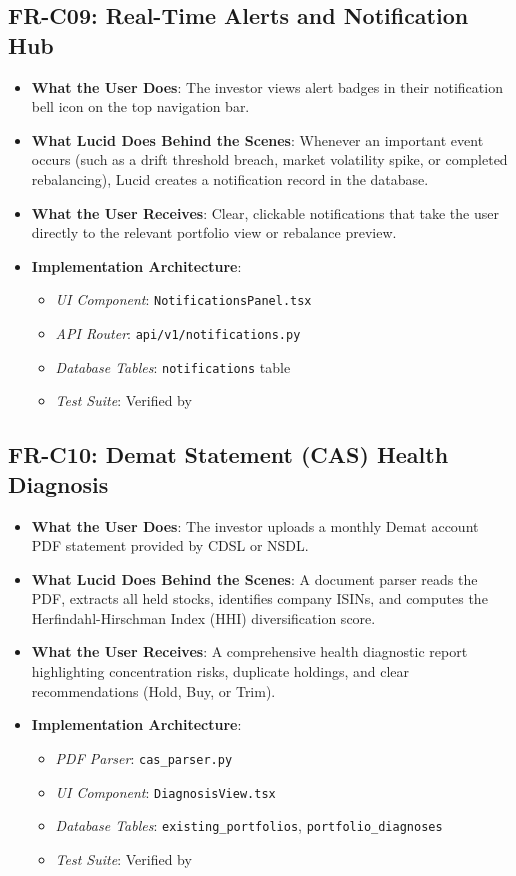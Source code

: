 \subsection{FR-C09: Real-Time Alerts and Notification Hub}
\begin{itemize}
    \item \textbf{What the User Does}: The investor views alert badges in their notification bell icon on the top navigation bar.
    \item \textbf{What Lucid Does Behind the Scenes}: Whenever an important event occurs (such as a drift threshold breach, market volatility spike, or completed rebalancing), Lucid creates a notification record in the database.
    \item \textbf{What the User Receives}: Clear, clickable notifications that take the user directly to the relevant portfolio view or rebalance preview.
    \item \textbf{Implementation Architecture}:
    \begin{itemize}
        \item \textit{UI Component}: \texttt{NotificationsPanel.tsx}
        \item \textit{API Router}: \texttt{api/v1/notifications.py}
        \item \textit{Database Tables}: \texttt{notifications} table
        \item \textit{Test Suite}: Verified by 
    \end{itemize}
\end{itemize}

\subsection{FR-C10: Demat Statement (CAS) Health Diagnosis}
\begin{itemize}
    \item \textbf{What the User Does}: The investor uploads a monthly Demat account PDF statement provided by CDSL or NSDL.
    \item \textbf{What Lucid Does Behind the Scenes}: A document parser reads the PDF, extracts all held stocks, identifies company ISINs, and computes the Herfindahl-Hirschman Index (HHI) diversification score.
    \item \textbf{What the User Receives}: A comprehensive health diagnostic report highlighting concentration risks, duplicate holdings, and clear recommendations (Hold, Buy, or Trim).
    \item \textbf{Implementation Architecture}:
    \begin{itemize}
        \item \textit{PDF Parser}: \texttt{cas\_parser.py}
        \item \textit{UI Component}: \texttt{DiagnosisView.tsx}
        \item \textit{Database Tables}: \texttt{existing\_portfolios}, \texttt{portfolio\_diagnoses}
        \item \textit{Test Suite}: Verified by 
    \end{itemize}
\end{itemize}

